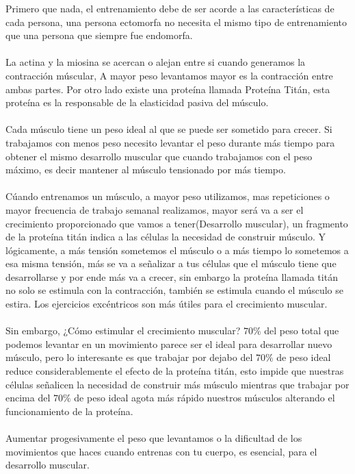 \documentclass{article}
\begin{document}
Primero que nada, el entrenamiento debe de ser acorde a las características de cada persona, una persona ectomorfa no necesita el mismo tipo de entrenamiento que una persona que siempre fue endomorfa.\\
\\
La actina y la miosina se acercan o alejan entre si cuando generamos la contracción múscular, A mayor peso levantamos mayor es la contracción entre ambas partes. Por otro lado existe una proteína llamada Proteína Titán, esta proteína es la responsable de la elasticidad pasiva del músculo.\\
\\
Cada músculo tiene un peso ideal al que se puede ser sometido para crecer. Si trabajamos con menos peso necesito levantar el peso durante más tiempo para obtener el mismo desarrollo muscular que cuando trabajamos con el peso máximo, es decir mantener al músculo tensionado por más tiempo.\\
\\
Cúando entrenamos un músculo, a mayor peso utilizamos, mas repeticiones o mayor frecuencia de trabajo semanal realizamos, mayor será va a ser el crecimiento proporcionado que vamos a tener(Desarrollo muscular), un fragmento de la proteína titán indica a las células la necesidad de construir músculo. Y lógicamente, a más tensión sometemos el músculo o a más tiempo lo sometemos a esa misma tensión, más se va a señalizar a tus células que el músculo tiene que desarrollarse y por ende más va a crecer, sin embargo la proteína llamada titán no solo se estimula con la contracción, también se estimula cuando el músculo se estira. Los ejercicios excéntricos son más útiles para el crecimiento muscular.\\
\\
Sin embargo, ¿Cómo estimular el crecimiento muscular? $70\%$ del peso total que podemos levantar en un movimiento parece ser el ideal para desarrollar nuevo músculo, pero lo interesante es que trabajar por dejabo del $70\%$ de peso ideal reduce considerablemente el efecto de la proteína titán, esto impide que nuestras células señalicen la necesidad de construir más músculo mientras que trabajar por encima del $70\%$ de peso ideal agota más rápido nuestros músculos alterando el funcionamiento de la proteína.\\
\\
Aumentar progesivamente el peso que levantamos o la dificultad de los movimientos que haces cuando entrenas con tu cuerpo, es esencial, para el desarrollo muscular. \\
\end{document}
